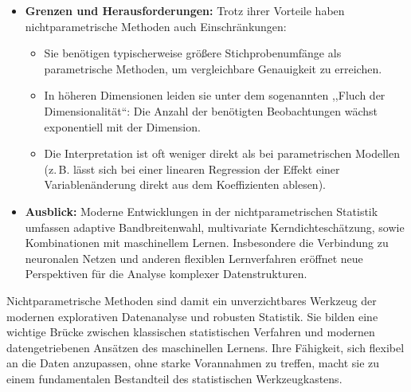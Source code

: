 \documentclass[a4paper, 11pt]{scrartcl}
\newif\ifshowtext
\begin{document}
\begin{itemize}
	\item \textbf{Grenzen und Herausforderungen:} Trotz ihrer Vorteile haben nichtparametrische Methoden auch Einschränkungen:
	      \begin{itemize}
	      	\item Sie benötigen typischerweise größere Stichprobenumfänge als parametrische Methoden, um vergleichbare Genauigkeit zu erreichen.
	      	\item In höheren Dimensionen leiden sie unter dem sogenannten ,,Fluch der Dimensionalität``: Die Anzahl der benötigten Beobachtungen wächst exponentiell mit der Dimension.
	      	\item Die Interpretation ist oft weniger direkt als bei parametrischen Modellen (z.\,B. lässt sich bei einer linearen Regression der Effekt einer Variablenänderung direkt aus dem Koeffizienten ablesen).
	      \end{itemize}
	
	\item \textbf{Ausblick:} Moderne Entwicklungen in der nichtparametrischen Statistik umfassen adaptive Bandbreitenwahl, multivariate Kerndichteschätzung, sowie Kombinationen mit maschinellem Lernen. Insbesondere die Verbindung zu neuronalen Netzen und anderen flexiblen Lernverfahren eröffnet neue Perspektiven für die Analyse komplexer Datenstrukturen.
\end{itemize}

Nichtparametrische Methoden sind damit ein unverzichtbares Werkzeug der modernen explorativen Datenanalyse und robusten Statistik. Sie bilden eine wichtige Brücke zwischen klassischen statistischen Verfahren und modernen datengetriebenen Ansätzen des maschinellen Lernens. Ihre Fähigkeit, sich flexibel an die Daten anzupassen, ohne starke Vorannahmen zu treffen, macht sie zu einem fundamentalen Bestandteil des statistischen Werkzeugkastens.

\ifshowtext
\printbibliography
\fi
	
\end{document}
